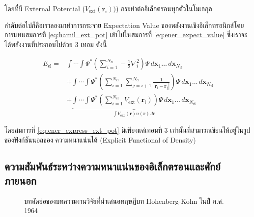 \noindent โดยที่มี External Potential ($V_{\text{ext}}(\bm{r}_{i}))$) กระทำต่ออิเล็กตรอนทุกตัวในโมเลกุล 

ลำดับต่อไปก็คือเราลองมาทำการกระจาย Expectation Value ของพลังงานเชิงอิเล็กทรอนิกส์โดยการแทนสมการที่ \ref{eq:hamil_ext_pot} 
เข้าไปในสมการที่ \ref{eq:ener_expect_value} ซึ่งเราจะได้พลังงานที่ประกอบไปด้วย 3 เทอม ดังนี้

\begin{align}\label{eq:ener_express_ext_pot}
    E_{\text{el}} =& \int \cdots \int \Psi^{\ast} 
    \left ( \sum^{N_{\text{el}}}_{i=1} -\frac{1}{2} \nabla^{2}_{i} \right ) 
    \Psi \, d\bm{x}_{1} \dots \, d\bm{x}_{N_{\text{el}}} \nonumber \\
    &+ \int \cdots \int \Psi^{\ast} 
    \left ( \sum^{N_{\text{el}}}_{i=1} \sum^{N_{\text{el}}}_{j=i+1} \frac{1}{|\bm{r}_{i}-\bm{r}_{j}|} \right ) 
    \Psi \, d\bm{x}_{1} \dots \, d\bm{x}_{N_{\text{el}}} \nonumber \\
    &+ \underbrace{\int \cdots \int \Psi^{\ast} 
    \left ( \sum^{N_{\text{el}}}_{i=1} V_{\text{ext}}(\bm{r}_{i}) \right ) 
    \Psi \, d\bm{x}_{1} \dots \, d\bm{x}_{N_{\text{el}}}%
    }_{\textstyle \int V_{\text{ext}}(\bm{r}) n(\bm{r}) \, d\bm{r}}
\end{align}

\noindent โดยสมการที่ \ref{eq:ener_express_ext_pot} มีเพียงแค่เทอมที่ 3 เท่านั้นที่สามารถเขียนให้อยู่ในรูปของฟังก์ชันนอลของ%
ความหนาแน่นได้ (Explicit Functional of Density)

\subsection{ความสัมพันธ์ระหว่างความหนาแน่นของอิเล็กตรอนและศักย์ภายนอก}
\label{ssec:ener_density_ext_pot}

\begin{figure}[H]
    \centering
    \caption{บทคัดย่อของบทความงานวิจัยที่นำเสนอทฤษฎีบท Hohenberg-Kohn ในปี ค.ศ. 1964}
    \label{fig:hohenberg_kohn_abs}
\end{figure}

